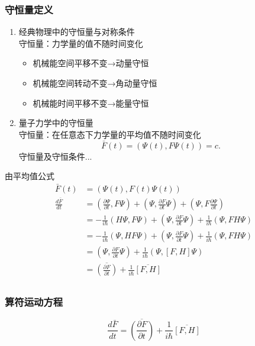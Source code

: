 \begin{frame} 
    \frametitle{守恒量定义}
    \begin{enumerate}
        \item  经典物理中的守恒量与对称条件\\
                守恒量：力学量的值不随时间变化\\
                \begin{itemize}
                    \item 机械能空间平移不变→动量守恒
                    \item 机械能空间转动不变→角动量守恒
                    \item 机械能时间平移不变→能量守恒
                \end{itemize}
        \item  量子力学中的守恒量\\
                守恒量：在任意态下力学量的平均值不随时间变化\\
                $$ \bar{F}(t)=(\Psi(t), F\Psi(t)) =c.  $$
                守恒量及守恒条件... 
    \end{enumerate}
\end{frame} 

\begin{frame}
    由平均值公式  
        \begin{equation*}
            \begin{split} 
            \bar{F}(t)&=(\Psi(t), F(t)\Psi(t)) \\
            \frac{d\bar{F}}{dt}&=(\frac{\partial\Psi }{\partial t}, F\Psi) +(\Psi, \frac{\partial F }{\partial t}\Psi) +(\Psi, F\frac{\partial\Psi }{\partial t}) \\
            &= - \frac{1}{i\hbar} (H\Psi, F\Psi)+(\Psi, \frac{\partial F }{\partial t}\Psi) + \frac{1}{i\hbar} (\Psi, FH\Psi) \\
            &= - \frac{1}{i\hbar} (\Psi, HF\Psi)+(\Psi, \frac{\partial F }{\partial t}\Psi) + \frac{1}{i\hbar} (\Psi, FH\Psi) \\
            &= (\Psi, \frac{\partial F }{\partial t}\Psi)  +\frac{1}{i\hbar} (\Psi, [F,H]\Psi) \\
            &=\overline{(\frac{\partial F }{\partial t})}  +\frac{1}{i\hbar} \overline{[F,H]} \\
            \end{split}  
        \end{equation*}
    \end{frame} 

\begin{frame}
    \frametitle{算符运动方程}  
        \[\boxed{\frac{d\bar{F}}{dt} = \overline{(\frac{\partial F }{\partial t})}  +\frac{1}{i\hbar} \overline{[F,H]}}\]
\end{frame} 

